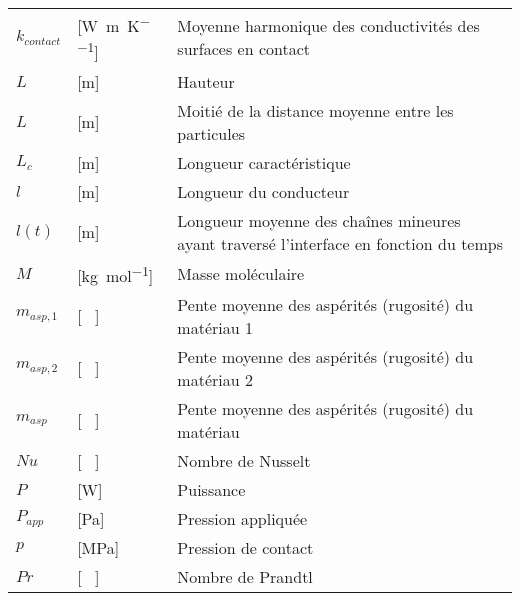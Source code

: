 \begin{longtable}{l p{2.5cm} p{4in}}
	$k_{contact}$     & [\si{\watt\per\metre\per\kelvin}]                   & Moyenne harmonique des conductivités des surfaces en contact \\
	$L$               & [\si{\metre}]                                       & Hauteur                                                      \\
	$L$               & [\si{\metre}]                                       & Moitié de la distance moyenne entre les particules           \\
	$L_c$             & [\si{\metre}]                                       & Longueur caractéristique                                     \\
	$l$               & [\si{\metre}]                                       & Longueur du conducteur                                       \\
	$l(t)$            & [\si{\metre}]                                       & Longueur moyenne des chaînes mineures ayant traversé l'interface en fonction du temps \\
	$M$               & [\si{\kilogram\per\mole}]                           & Masse moléculaire                                            \\
	$m_{asp,1}$       & [ \ ]                                               & Pente moyenne des aspérités (rugosité) du matériau 1         \\
	$m_{asp,2}$       & [ \ ]                                               & Pente moyenne des aspérités (rugosité) du matériau 2         \\
	$m_{asp}$         & [ \ ]                                               & Pente moyenne des aspérités (rugosité) du matériau           \\
	$Nu$              & [ \ ]                                               & Nombre de Nusselt                                            \\
	$P$               & [\si{\watt}]                                        & Puissance                                                    \\
	$P_{app}$         & [\si{\pascal}]                                      & Pression appliquée                                           \\
	$p$               & [\si{\mega\pascal}]                                 & Pression de contact                                          \\
	$Pr$              & [ \ ]                                               & Nombre de Prandtl                                            \\

\end{longtable}
